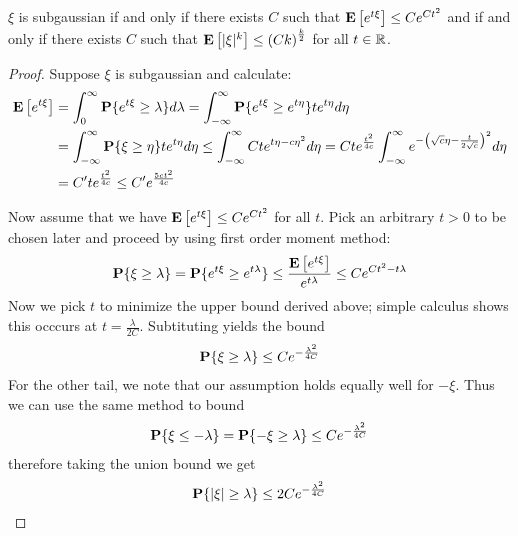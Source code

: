 \begin{lem}\label{SubgaussianEquivalence}$\xi$ is subgaussian if and only if there exists $C$ such
  that $\textbf{E}\left[e^{t\xi}\right] \leq C e^{Ct^2}$ and if and only if
    there exists $C$ such that $\textbf{E}\left[|\xi|^k\right] \leq
    \left(Ck\right)^{\frac{k}{2}}$ for all $t \in \mathbb{R}$.
\end{lem}
\begin{proof}
Suppose $\xi$ is subgaussian and calculate:
\begin{align*}
\textbf{E}\left[e^{t\xi}\right] &= \int_0^\infty \textbf{P}\{e^{t\xi} \geq
    \lambda\} d\lambda 
= \int_{-\infty}^\infty \textbf{P}\{e^{t\xi} \geq e^{t\eta}\} t
e^{t\eta} d\eta \\
&= \int_{-\infty}^\infty \textbf{P}\{\xi \geq \eta\} t
e^{t\eta} d\eta 
\leq \int_{-\infty}^\infty C t e^{t\eta - c\eta^2} d\eta  
= C t e^{\frac{t^2}{4c}}\int_{-\infty}^\infty 
e^{-\left(\sqrt{c}\eta - \frac{t}{2\sqrt{c}}\right)^2} d\eta \\
&= C^\prime t e^{\frac{t^2}{4c}} 
\leq C^\prime e^{\frac{5c t^2}{4c}} 
\end{align*}

Now assume that we have $\textbf{E}\left[e^{t\xi}\right] \leq C e^{Ct^2}$ for
all $t$.  Pick an arbitrary $t>0$ to be
chosen later and proceed by using first order
moment method:
\begin{align*}
\textbf{P}\{\xi \geq \lambda\} &= \textbf{P}\{e^{t\xi} \geq
  e^{t\lambda}\} 
\leq \frac{\textbf{E}\left[e^{t\xi}\right]}{e^{t\lambda}} 
\leq C e^{Ct^2 - t\lambda} \\
\end{align*}
Now we pick $t$ to minimize the upper bound derived above; simple
calculus shows this occcurs at $t=\frac{\lambda}{2C}$.  Subtituting
yields the bound 
\begin{align*}
\textbf{P}\{\xi \geq \lambda\} \leq C e ^ {-\frac{\lambda^2}{4C}}
\end{align*}
For the other tail, we note that our assumption holds equally well for
$-\xi$.  Thus we can use the same method to bound 
\begin{align*}
\textbf{P}\{\xi \leq -\lambda\} = \textbf{P}\{-\xi \geq \lambda\} \leq C e ^ {-\frac{\lambda^2}{4C}}
\end{align*}
therefore taking the union bound we get
\begin{align*}
\textbf{P}\{|\xi| \geq \lambda\} \leq 2 C e ^ {-\frac{\lambda^2}{4C}}
\end{align*}


\end{proof}
